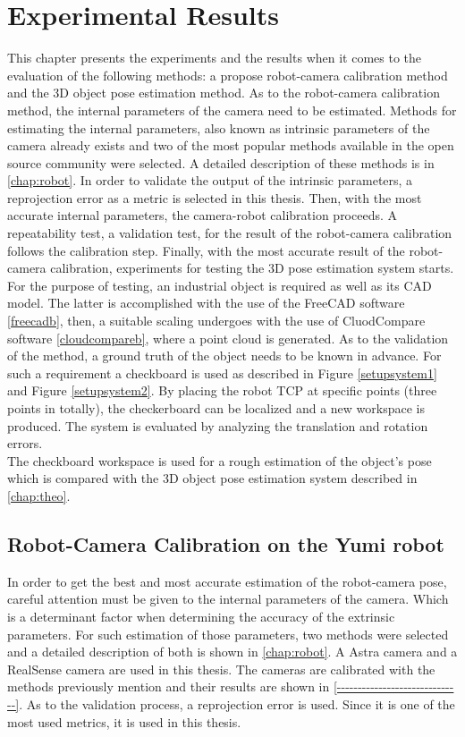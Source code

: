 
\chapter{Experimental Results}
\label{chap:exp}

This chapter presents the experiments and the results when it comes to the evaluation of the following methods: a propose robot-camera calibration method and the 3D object pose estimation method. As to the robot-camera calibration method, the internal parameters of the camera need to be estimated. Methods for estimating the internal parameters, also known as intrinsic parameters of the camera already exists and two of the most popular methods available in the open source community were selected. A detailed description of these methods is in \ref{chap:robot}. In order to validate the output of the intrinsic parameters, a reprojection error as a metric is selected in this thesis. Then, with the most accurate internal parameters, the camera-robot calibration proceeds. A repeatability test, a validation test, for the result of the robot-camera calibration follows the calibration step. Finally, with the most accurate result of the robot-camera calibration, experiments for testing the 3D pose estimation system starts. For the purpose of testing, an industrial object is required as well as its CAD model. The latter is accomplished with the use of the FreeCAD software \ref{freecadb}, then, a suitable scaling undergoes with the use of CluodCompare software \ref{cloudcompareb}, where a point cloud is generated. As to the validation of the method, a ground truth of the object needs to be known in advance. For such a requirement a checkboard is used as described in Figure \ref{setupsystem1} and Figure \ref{setupsystem2}. By placing the robot TCP at specific points (three points in totally), the checkerboard can be localized and a new workspace is produced. The system is evaluated by analyzing the translation and rotation errors.\\
The checkboard workspace is used for a rough estimation of the object's pose which is compared with the 3D object pose estimation system described in \ref{chap:theo}.  


\section{Robot-Camera Calibration on the Yumi robot}

In order to get the best and most accurate estimation of the robot-camera pose, careful attention must be given to the internal parameters of the camera. Which is a determinant factor when determining the accuracy of the extrinsic parameters. For such estimation of those parameters, two methods were selected and a detailed description of both is shown in \ref{chap:robot}. A Astra camera and a RealSense camera are used in this thesis. The cameras are calibrated with the methods previously mention and their results are shown in \ref{------------------------------}. As to the validation process, a reprojection error is used. Since it is one of the most used metrics,  it is used in this thesis. 


